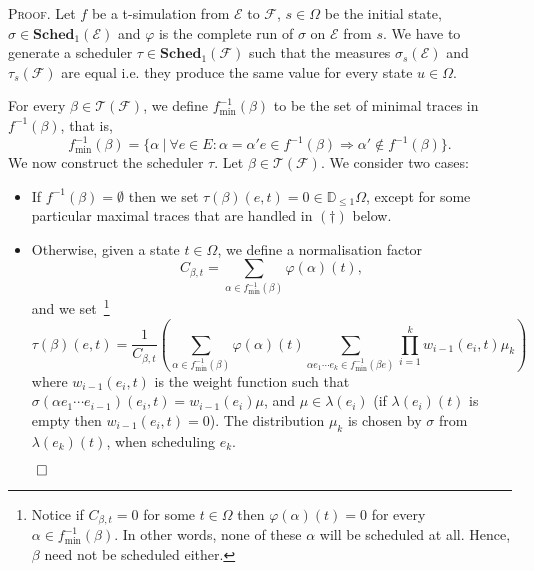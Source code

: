 \documentclass[review]{elsart}
\newenvironment{proof}{\par
\noindent
\textsc{Proof. }
\noindent}{\hfill\(\qed\)}
\newcommand{\Jip}{\mathbb{D}_{\le1}}
\newcommand{\EE}{\mathcal{E}}
\newcommand{\FF}{\mathcal{F}}
\newcommand{\TT}{\mathcal{T}}
\newcommand{\sched}{\mathbf{Sched}}
\begin{document}
\begin{proof}
Let $f$ be a t-simulation from $\EE$ to $\FF$, $s{\in}\Omega$ be the initial state, $\sigma{\in}\sched_1(\EE)$ and $\varphi$ is the complete run of $\sigma$ on $\EE$ from $s$. We have to generate a scheduler $\tau{\in}\sched_1(\FF)$ such that the measures $\sigma_s(\EE)$ and  $\tau_s(\FF)$ are equal i.e. they produce the same value for every state $u{\in}\Omega$.

For every $\beta{\in}\TT(\FF)$, we define $f^{-1}_{\min}(\beta)$ to be the set of minimal traces in $f^{-1}(\beta)$, that is,
\[
	f_{\min}^{-1}(\beta) = \{\alpha\ |\ \forall e{\in} E:\alpha {=} \alpha' e{\in} f^{-1}(\beta)\Rightarrow \alpha' {\notin} f^{-1}(\beta)\}.
\]
We now construct the scheduler $\tau$. Let $\beta{\in}\TT(\FF)$. We consider two cases:
\begin{itemize}
\item If $f^{-1}(\beta) = \emptyset$ then we set $\tau(\beta)(e,t) = 0{\in}\Jip\Omega$, except for some particular maximal traces that are handled in $(\dagger)$ below. 
\item Otherwise, given a state $t{\in}\Omega$, we define a normalisation factor 
\[
	C_{\beta,t} = \sum_{\alpha{\in} f_{\min}^{-1}(\beta)}{\varphi}(\alpha)(t),
\]
and we set~\footnote{Notice if $C_{\beta,t} = 0$ for some $t{\in}\Omega$ then ${\varphi}(\alpha)(t) = 0$ for every $\alpha{\in} f_{\min}^{-1}(\beta)$. In other words, none of these $\alpha$ will be scheduled at all. Hence, $\beta$ need not be scheduled either.}
\[
	\tau(\beta)(e,t) = \frac{1}{C_{\beta,t}}\left(\sum_{\alpha{\in} f_{\min}^{-1}(\beta)}\varphi(\alpha)(t)\sum_{\alpha e_1\cdots e_k{\in} f_{\min}^{-1}(\beta e)}\prod_{i=1}^{k}w_{i-1}(e_i,t)\mu_k\right)
\]
where $w_{i-1}(e_i,t)$ is the weight function such that $\sigma(\alpha e_1\cdots e_{i-1})(e_i,t) = w_{i-1}(e_i)\mu$, and $\mu{\in}\lambda(e_{i})$ (if $\lambda(e_{i})(t)$ is empty then $w_{i-1}(e_i,t) = 0$). The distribution $\mu_k$ is chosen by $\sigma$ from $\lambda(e_k)(t)$, when scheduling $e_k$.
\end{itemize}


\end{proof}
\end{document}
